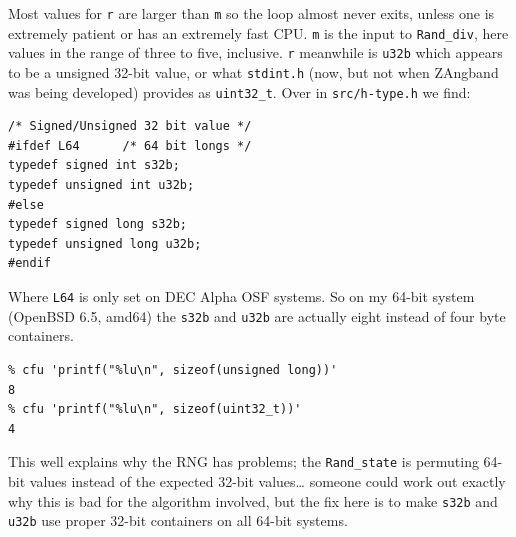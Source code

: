 \documentclass[12pt,a4paper]{article}
\begin{document}
Most values for \texttt{r} are larger than \texttt{m} so the loop almost
never exits, unless one is extremely patient or has an extremely fast
CPU. \texttt{m} is the input to \texttt{Rand\_div}, here values in the
range of three to five, inclusive. \texttt{r} meanwhile is \texttt{u32b}
which appears to be a unsigned 32-bit value, or what \texttt{stdint.h}
(now, but not when ZAngband was being developed) provides as
\texttt{uint32\_t}. Over in \texttt{src/h-type.h} we find:

\begin{verbatim}
/* Signed/Unsigned 32 bit value */
#ifdef L64      /* 64 bit longs */
typedef signed int s32b;
typedef unsigned int u32b;
#else
typedef signed long s32b;
typedef unsigned long u32b;
#endif
\end{verbatim}

Where \texttt{L64} is only set on DEC Alpha OSF systems. So on my 64-bit
system (OpenBSD 6.5, amd64) the \texttt{s32b} and \texttt{u32b} are
actually eight instead of four byte containers.

\begin{verbatim}
% cfu 'printf("%lu\n", sizeof(unsigned long))'
8
% cfu 'printf("%lu\n", sizeof(uint32_t))'     
4
\end{verbatim}

This well explains why the RNG has problems; the \texttt{Rand\_state} is
permuting 64-bit values instead of the expected 32-bit values\ldots
someone could work out exactly why this is bad for the algorithm
involved, but the fix here is to make \texttt{s32b} and \texttt{u32b}
use proper 32-bit containers on all 64-bit systems.
\end{document}
